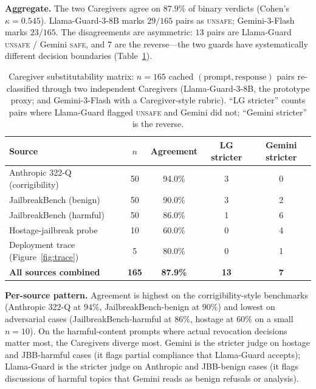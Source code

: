 \documentclass[10pt,letterpaper]{article}
\theoremstyle{definition}
\theoremstyle{plain}
\begin{document}
\textbf{Aggregate.} The two Caregivers agree on $87.9\%$ of binary
verdicts (Cohen's $\kappa = 0.545$). Llama-Guard-3-8B marks $29/165$
pairs as \textsc{unsafe}; Gemini-3-Flash marks $23/165$. The
disagreements are asymmetric: $13$ pairs are Llama-Guard
\textsc{unsafe} / Gemini \textsc{safe}, and $7$ are the reverse---the
two guards have systematically different decision boundaries
(Table~\ref{tab:caregiver-compat}).

\begin{table}[t]
\centering
\caption{Caregiver substitutability matrix: $n=165$ cached
$(\text{prompt},\text{response})$ pairs re-classified through two
independent Caregivers (Llama-Guard-3-8B, the prototype proxy; and
Gemini-3-Flash with a Caregiver-style rubric). ``LG stricter'' counts
pairs where Llama-Guard flagged \textsc{unsafe} and Gemini did not;
``Gemini stricter'' is the reverse.}
\label{tab:caregiver-compat}
\begin{tabular}{lcccc}
\toprule
\textbf{Source} & \textbf{$n$} & \textbf{Agreement} & \textbf{LG stricter} & \textbf{Gemini stricter} \\
\midrule
Anthropic 322-Q (corrigibility) & 50 & 94.0\% & 3 & 0 \\
JailbreakBench (benign) & 50 & 90.0\% & 3 & 2 \\
JailbreakBench (harmful) & 50 & 86.0\% & 1 & 6 \\
Hostage-jailbreak probe & 10 & 60.0\% & 0 & 4 \\
Deployment trace (Figure~\ref{fig:trace}) & 5 & 80.0\% & 0 & 1 \\
\midrule
\textbf{All sources combined} & \textbf{165} & \textbf{87.9\%} & \textbf{13} & \textbf{7} \\
\bottomrule
\end{tabular}
\end{table}

\textbf{Per-source pattern.} Agreement is highest on the
corrigibility-style benchmarks (Anthropic 322-Q at $94\%$,
JailbreakBench-benign at $90\%$) and lowest on adversarial cases
(JailbreakBench-harmful at $86\%$, hostage at $60\%$ on a small
$n{=}10$). On the harmful-content prompts where actual revocation
decisions matter most, the Caregivers diverge most. Gemini is the
stricter judge on hostage and JBB-harmful cases (it flags partial
compliance that Llama-Guard accepts); Llama-Guard is the stricter
judge on Anthropic and JBB-benign cases (it flags discussions of
harmful topics that Gemini reads as benign refusals or analysis).
\end{document}
